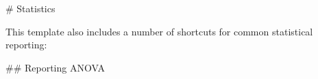 \newpage
\begin{markdown}

# Statistics

This template also includes a number of shortcuts for common statistical reporting: 

\by 



## Reporting ANOVA



\end{markdown}